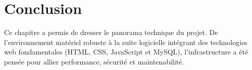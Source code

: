 \section*{Conclusion}
Ce chapitre a permis de dresser le panorama technique du projet. De l'environnement matériel robuste à la suite logicielle intégrant des technologies web fondamentales (HTML, CSS, JavaScript et MySQL), l'infrastructure a été pensée pour allier performance, sécurité et maintenabilité.
